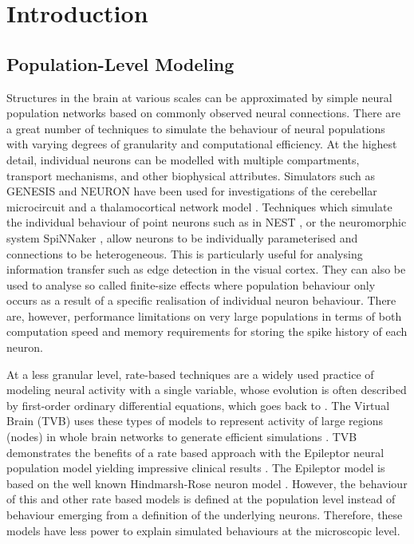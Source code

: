 \documentclass[utf8]{frontiersSCNS} %
\begin{document}
\section{Introduction}

\subsection{Population-Level Modeling}
Structures in the brain at various scales can be approximated by simple neural population networks based on commonly observed neural connections. There are a great number of techniques to simulate the behaviour of neural populations with varying degrees of granularity and computational efficiency. 
At the highest detail, individual neurons can be modelled with multiple compartments, transport mechanisms, and other biophysical attributes. Simulators such as GENESIS \citep{wilson1988genesis,bower2012book} and NEURON \citep{hines2001neuron} have been used for investigations of the cerebellar microcircuit \citep{d2016modeling} and a thalamocortical network model \citep{traub2005single}. Techniques which simulate the individual behaviour of point neurons such as in NEST \citep{Gewaltig:NEST}, or the neuromorphic system SpiNNaker \citep{9fed179f612a405b8801b67ef74bc737}, allow neurons to be individually parameterised and connections to be heterogeneous. This is particularly useful for analysing information transfer such as edge detection in the visual cortex. They can also be used to analyse so called finite-size effects where population behaviour only occurs as a result of a specific realisation of individual neuron behaviour. There are, however, performance limitations on very large populations in terms of both computation speed and memory requirements for storing the spike history of each neuron. 

At a less granular level, rate-based techniques are a widely used practice of modeling neural activity with a single variable, whose evolution is often described by first-order ordinary differential equations, which goes back to \cite{wilson1972excitatory}. The Virtual Brain (TVB) uses these types of models to represent activity of large regions (nodes) in whole brain networks to generate efficient simulations \citep{sanz2013virtual,jirsa2014nature}. TVB demonstrates the benefits of a rate based approach with the Epileptor neural population model yielding impressive clinical results \citep{proix2017individual}. The Epileptor model is based on the well known Hindmarsh-Rose neuron model \citep{hindmarsh1984model}. However, the behaviour of this and other rate based models is defined at the population level instead of behaviour emerging from a definition of the underlying neurons. Therefore, these models have less power to explain simulated behaviours at the microscopic level.
\end{document}
